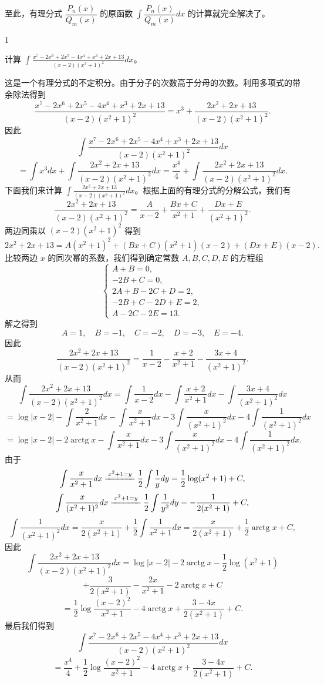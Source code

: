 至此，有理分式 \(\dfrac{P_n(x)}{Q_m(x)}\) 的原函数 \(\displaystyle\int\dfrac{P_n(x)}{Q_m(x)}dx\) 的计算就完全解决了。

\begin{sourceexample}{1}

	计算 \(\displaystyle\int\frac{x^7-2x^6+2x^5-4x^4+x^3+2x+13}{(x-2)(x^2+1)^2}dx\)。

	这是一个有理分式的不定积分。由于分子的次数高于分母的次数。利用多项式的带余除法得到
	\[
	\frac{x^7-2x^6+2x^5-4x^4+x^3+2x+13}{(x-2)(x^2+1)^2}=x^3+\frac{2x^2+2x+13}{(x-2)(x^2+1)^2}.
	\]
	因此
	\[
	\int\frac{x^7-2x^6+2x^5-4x^4+x^3+2x+13}{(x-2)(x^2+1)^2}dx
	\]
	\[
	=\int x^3dx+\int\frac{2x^2+2x+13}{(x-2)(x^2+1)^2}dx=\frac{x^4}{4}+\int\frac{2x^2+2x+13}{(x-2)(x^2+1)^2}dx.
	\]
	下面我们来计算 \(\displaystyle\int\frac{2x^2+2x+13}{(x-2)(x^2+1)^2}dx\)。根据上面的有理分式的分解公式，我们有
	\[
	\frac{2x^2+2x+13}{(x-2)(x^2+1)^2}=\frac{A}{x-2}+\frac{Bx+C}{x^2+1}+\frac{Dx+E}{(x^2+1)^2}.
	\]
	两边同乘以 \((x-2)(x^2+1)^2\) 得到
	\[
	2x^2+2x+13=A(x^2+1)^2+(Bx+C)(x^2+1)(x-2)+(Dx+E)(x-2).
	\]
	比较两边 \(x\) 的同次幂的系数，我们得到确定常数 \(A,B,C,D,E\) 的方程组
	\[
	\begin{cases} A+B=0, \\ -2B+C=0, \\ 2A+B-2C+D=2, \\ -2B+C-2D+E=2, \\ A-2C-2E=13. \end{cases}
	\]
	解之得到
	\[
	A=1,\quad B=-1,\quad C=-2,\quad D=-3,\quad E=-4.
	\]
	因此
	\[
	\frac{2x^2+2x+13}{(x-2)(x^2+1)^2}=\frac1{x-2}-\frac{x+2}{x^2+1}-\frac{3x+4}{(x^2+1)^2}.
	\]
	从而
	\[
	\int\frac{2x^2+2x+13}{(x-2)(x^2+1)^2}dx=\int\frac1{x-2}dx-\int\frac{x+2}{x^2+1}dx-\int\frac{3x+4}{(x^2+1)^2}dx
	\]
	\[
	=\log|x-2|-\int\frac2{x^2+1}dx-\int\frac{x}{x^2+1}dx-3\int\frac{x}{(x^2+1)^2}dx-4\int\frac1{(x^2+1)^2}dx
	\]
	\[
	=\log|x-2|-2\operatorname{arctg}x-\int\frac{x}{x^2+1}dx-3\int\frac{x}{(x^2+1)^2}dx-4\int\frac1{(x^2+1)^2}dx.
	\]
	由于
	\[
	\int\frac{x}{x^2+1}dx\xlongequal{x^2+1=y}\frac12\int\frac1y dy=\frac12\log(x^2+1)+C,
	\]
	\[
	\int\frac{x}{(x^2+1)^2}dx\xlongequal{x^2+1=y}\frac12\int\frac1{y^2}dy=-\frac1{2(x^2+1)}+C,
	\]
	\[
	\int\frac1{(x^2+1)^2}dx=\frac{x}{2(x^2+1)}+\frac12\int\frac1{x^2+1}dx=\frac{x}{2(x^2+1)}+\frac12\operatorname{arctg}x+C,
	\]
	因此
	\[
	\int\frac{2x^2+2x+13}{(x-2)(x^2+1)^2}dx=\log|x-2|-2\operatorname{arctg}x-\frac12\log(x^2+1)
	\]
	\[
	+\frac3{2(x^2+1)}-\frac{2x}{x^2+1}-2\operatorname{arctg}x+C
	\]
	\[
	=\frac12\log\frac{(x-2)^2}{x^2+1}-4\operatorname{arctg}x+\frac{3-4x}{2(x^2+1)}+C.
	\]
	最后我们得到
	\[
	\int\frac{x^7-2x^6+2x^5-4x^4+x^3+2x+13}{(x-2)(x^2+1)^2}dx
	\]
	\[
	=\frac{x^4}{4}+\frac12\log\frac{(x-2)^2}{x^2+1}-4\operatorname{arctg}x+\frac{3-4x}{2(x^2+1)}+C.
	\]

\end{sourceexample}

